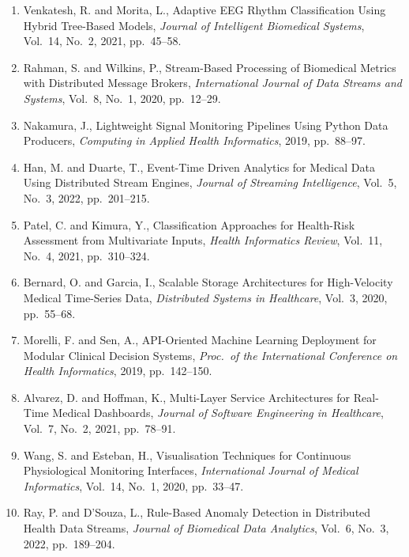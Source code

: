\documentclass[12pt, a4paper, oneside]{report}
\begin{document}
\begin{enumerate}
    \item[\lbrack 1\rbrack] Venkatesh, R. and Morita, L., Adaptive EEG Rhythm Classification Using Hybrid Tree-Based Models, \textit{Journal of Intelligent Biomedical Systems}, Vol.~14, No.~2, 2021, pp.~45--58. \label{ref1}
    \item[\lbrack 2\rbrack] Rahman, S. and Wilkins, P., Stream-Based Processing of Biomedical Metrics with Distributed Message Brokers, \textit{International Journal of Data Streams and Systems}, Vol.~8, No.~1, 2020, pp.~12--29. \label{ref2}
    \item[\lbrack 3\rbrack] Nakamura, J., Lightweight Signal Monitoring Pipelines Using Python Data Producers, \textit{Computing in Applied Health Informatics}, 2019, pp.~88--97. \label{ref3}
    \item[\lbrack 4\rbrack] Han, M. and Duarte, T., Event-Time Driven Analytics for Medical Data Using Distributed Stream Engines, \textit{Journal of Streaming Intelligence}, Vol.~5, No.~3, 2022, pp.~201--215. \label{ref4}
    \item[\lbrack 5\rbrack] Patel, C. and Kimura, Y., Classification Approaches for Health-Risk Assessment from Multivariate Inputs, \textit{Health Informatics Review}, Vol.~11, No.~4, 2021, pp.~310--324. \label{ref5}
    \item[\lbrack 6\rbrack] Bernard, O. and Garcia, I., Scalable Storage Architectures for High-Velocity Medical Time-Series Data, \textit{Distributed Systems in Healthcare}, Vol.~3, 2020, pp.~55--68. \label{ref6}
    \item[\lbrack 7\rbrack] Morelli, F. and Sen, A., API-Oriented Machine Learning Deployment for Modular Clinical Decision Systems, \textit{Proc.\ of the International Conference on Health Informatics}, 2019, pp.~142--150. \label{ref7}
    \item[\lbrack 8\rbrack] Alvarez, D. and Hoffman, K., Multi-Layer Service Architectures for Real-Time Medical Dashboards, \textit{Journal of Software Engineering in Healthcare}, Vol.~7, No.~2, 2021, pp.~78--91. \label{ref8}
    \item[\lbrack 9\rbrack] Wang, S. and Esteban, H., Visualisation Techniques for Continuous Physiological Monitoring Interfaces, \textit{International Journal of Medical Informatics}, Vol.~14, No.~1, 2020, pp.~33--47. \label{ref9}
    \item[\lbrack 10\rbrack] Ray, P. and D'Souza, L., Rule-Based Anomaly Detection in Distributed Health Data Streams, \textit{Journal of Biomedical Data Analytics}, Vol.~6, No.~3, 2022, pp.~189--204. \label{ref10}
\end{enumerate}
\end{document}
